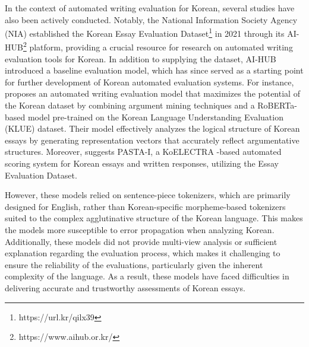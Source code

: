 In the context of automated writing evaluation for Korean, several studies have also been actively conducted. Notably, the National Information Society Agency (NIA) established the Korean \textsf{Essay Evaluation Dataset}\footnote{https://url.kr/qilx39} in 2021 through its \textsf{AI-HUB}\footnote{https://www.aihub.or.kr/} platform, providing a crucial resource for research on automated writing evaluation tools for Korean. In addition to supplying the dataset, AI-HUB introduced a baseline evaluation model, which has since served as a starting point for further development of Korean automated evaluation systems. For instance, \cite{lee2022argument} proposes an automated writing evaluation model that maximizes the potential of the Korean dataset by combining argument mining techniques and a RoBERTa-based model pre-trained on the Korean Language Understanding Evaluation (KLUE) \cite{park2021klue} dataset. Their model effectively analyzes the logical structure of Korean essays by generating representation vectors that accurately reflect argumentative structures. Moreover, \cite{lee2023pasta} suggests \textsf{PASTA-I}, a KoELECTRA \cite{kim2020lmkor}-based automated scoring system for Korean essays and written responses, utilizing the \textsf{Essay Evaluation Dataset}.

However, these models relied on sentence-piece tokenizers, which are primarily designed for English, rather than Korean-specific morpheme-based tokenizers suited to the complex agglutinative structure of the Korean language. This makes the models more susceptible to error propagation when analyzing Korean. Additionally, these models did not provide multi-view analysis or sufficient explanation regarding the evaluation process, which makes it challenging to ensure the reliability of the evaluations, particularly given the inherent complexity of the language. As a result, these models have faced difficulties in delivering accurate and trustworthy assessments of Korean essays.